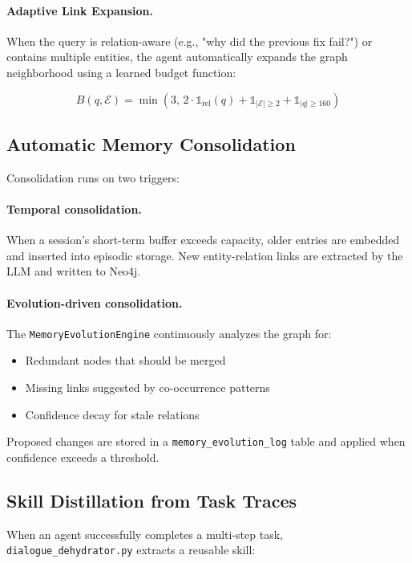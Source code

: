 \documentclass[11pt,a4paper]{article}
\begin{document}
\paragraph{Adaptive Link Expansion.}
When the query is relation-aware (e.g., "why did the previous fix fail?") 
or contains multiple entities, the agent automatically expands the graph neighborhood 
using a learned budget function:

\begin{equation}
B(q, \mathcal{E}) = \min(3, \, 2 \cdot \mathbb{1}_{\text{rel}}(q) + \mathbb{1}_{|\mathcal{E}| \geq 2} + \mathbb{1}_{|q| \geq 160})
\end{equation}

\subsection{Automatic Memory Consolidation}

Consolidation runs on two triggers:

\paragraph{Temporal consolidation.}
When a session's short-term buffer exceeds capacity,
older entries are embedded and inserted into episodic storage.
New entity-relation links are extracted by the LLM and written to Neo4j.

\paragraph{Evolution-driven consolidation.}
The \texttt{MemoryEvolutionEngine} continuously analyzes the graph for:
\begin{itemize}
    \item Redundant nodes that should be merged
    \item Missing links suggested by co-occurrence patterns
    \item Confidence decay for stale relations
\end{itemize}
Proposed changes are stored in a \texttt{memory\_evolution\_log} table 
and applied when confidence exceeds a threshold.

\subsection{Skill Distillation from Task Traces}

When an agent successfully completes a multi-step task, 
\texttt{dialogue\_dehydrator.py} extracts a reusable skill:
\end{document}
